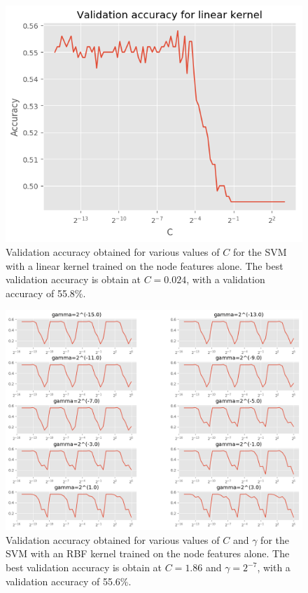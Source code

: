 \documentclass[12pt]{article}
\theoremstyle{definition}
\begin{document}
\begin{figure}[h]
	\includegraphics[width=1.0\textwidth]{node_svm/linear_reg}
	\centering
	\caption{Validation accuracy obtained for various values of $C$ for the SVM with a linear kernel trained on the node features alone. The best validation accuracy is obtain at $C=0.024$, with a validation accuracy of 55.8\%.}
	\label{fig/node_svm_linear_reg}
\end{figure}
\begin{figure}[h]
	\includegraphics[width=1.0\textwidth]{node_svm/rbf_reg}
	\centering
	\caption{Validation accuracy obtained for various values of $C$ and $\gamma$ for the SVM with an RBF kernel trained on the node features alone. The best validation accuracy is obtain at $C=1.86$ and $\gamma=2^{-7}$, with a validation accuracy of 55.6\%.}
	\label{fig/node_svm_rbf_reg}
\end{figure}
\end{document}
